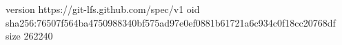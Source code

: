 version https://git-lfs.github.com/spec/v1
oid sha256:76507f564ba4750988340bf575ad97e0ef0881b61721a6c934c0f18cc20768df
size 262240
